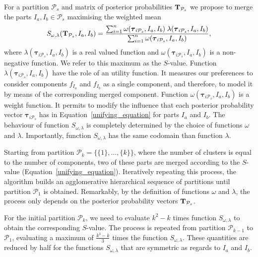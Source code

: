 \documentclass[submit]{smj}
\theoremstyle{definition}
\newcommand{\m}[1]{\boldsymbol{#1}}
\begin{document}
For a partition $\mathcal{P}_s$  and matrix of posterior probabilities $\text{\textbf{T}}_{\mathcal{P}_s}$ we propose to merge the parts $I_a, I_b \in \mathcal{P}_s$ maximising the weighted mean
\begin{equation}\label{unifying_equation}
S_{\omega, \lambda}( \text{\textbf{T}}_{\mathcal{P}_s},  I_a,  I_b) = \frac{\sum_{i=1}^n \omega(\m\tau_{i \mathcal{P}_s}, I_a, I_b) \; \lambda(\m\tau_{i \mathcal{P}_s}, I_a, I_b)}{\sum_{i=1}^n \omega(\m\tau_{i \mathcal{P}_s}, I_a, I_b) },
\end{equation}
where $\lambda(\m\tau_{i \mathcal{P}_s}, I_a, I_b)$ is a real valued function and $\omega(\m\tau_{i \mathcal{P}_s}, I_a, I_b)$ is a non-negative function. We refer to this maximum as the $S$-value. Function $\lambda(\m\tau_{i \mathcal{P}_s},  I_a,  I_b)$ have the role of an utility function. It measures our preferences to consider components $f_{I_a}$ and $f_{I_b}$ as a single component, and therefore, to model it by means of the corresponding merged component. Function $\omega(\m\tau_{i \mathcal{P}_s},  I_a,  I_b)$ is a weight function. It permits to modify the influence that each posterior probability vector $\m\tau_{i \mathcal{P}_s}$ has in Equation~\ref{unifying_equation} for parts $I_a$ and $I_b$. The behaviour of function $S_{\omega, \lambda}$ is completely determined by the choice of functions $\omega$ and $\lambda$. Importantly, function $S_{\omega, \lambda}$ has the same codomain than function $\lambda$.


Starting from partition $\mathcal{P}_k = \{ \{1\}, \dots, \{k\} \}$, where the number of clusters is equal to the number of components, two of these parts are merged according to the $S$-value (Equation~\ref{unifying_equation}). Iteratively repeating this process, the algorithm builds an agglomerative hierarchical sequence of partitions until partition $\mathcal{P}_1$ is obtained. Remarkably, by the definition of functions $\omega$ and $\lambda$, the process only depends on the posterior probability vectors $\text{\textbf{T}}_{\mathcal{P}_s}$.

For the initial partition $\mathcal{P}_k$, we need to evaluate $k^2-k$ times function $S_{\omega, \lambda}$ to obtain  the corresponding $S$-value. The process is repeated from partition $\mathcal{P}_{k-1}$ to $\mathcal{P}_1$, evaluating a maximum of $\frac{k^3-k}{3}$ times the function $S_{\omega, \lambda}$. These quantities are reduced by half for the functions $S_{\omega, \lambda}$ that are symmetric as regards to $I_a$ and $I_b$. 
\end{document}
